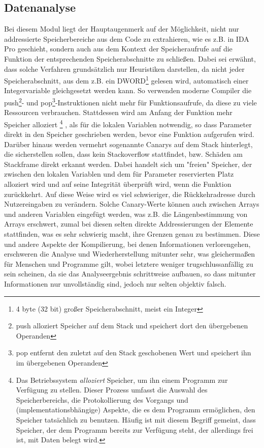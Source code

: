\documentclass[11pt]{article}
\begin{document}
\subsection{Datenanalyse}
Bei diesem Modul liegt der Hauptaugenmerk auf der Möglichkeit, nicht nur
addressierte Speicherbereiche aus dem Code zu extrahieren, wie es z.B. in IDA Pro
geschieht, sondern auch aus dem Kontext der Speicheraufrufe auf die Funktion der entsprechenden
Speicherabschnitte zu schließen. Dabei sei erwähnt, dass solche Verfahren grundsätzlich nur
Heuristiken darstellen, da nicht jeder Speicherabschnitt, aus dem z.B. ein DWORD\footnote{4 byte (32
bit) großer Speicherabschnitt, meist ein Integer} gelesen wird, automatisch einer Integervariable
gleichgesetzt werden kann. So verwenden moderne Compiler die push\footnote{push alloziert Speicher
auf dem Stack und speichert dort den übergebenen Operanden}- und pop\footnote{pop entfernt den
zuletzt auf den Stack geschobenen Wert und speichert ihn im übergebenen Operanden}-Instruktionen
nicht mehr für Funktionsaufrufe, da diese zu viele Ressourcen verbrauchen. Stattdessen wird am
Anfang der Funktion mehr Speicher alloziert
\footnote{Das Betriebssystem \textit{alloziert} Speicher, um ihn einem Programm zur Verfügung zu
stellen. Dieser Prozess umfasst die Auswahl des Speicherbereichs, die Protokollierung des Vorgangs
und (implementationsbhängige) Aspekte, die es dem Programm ermöglichen, den Speicher tatsächlich
zu benutzen. Häufig ist mit diesem Begriff gemeint, dass Speicher, der dem Programm bereits zur Verfügung
steht, der allerdings frei ist, mit Daten belegt wird.}
, als für die lokalen Variablen notwendig, so dass
Parameter direkt in den Speicher geschrieben werden, bevor eine Funktion aufgerufen wird. Darüber
hinaus werden vermehrt sogenannte Canarys auf dem Stack hinterlegt, die sicherstellen sollen, dass
kein Stackoverflow stattfindet, bzw. Schäden am Stackframe direkt erkannt werden.
Dabei handelt sich um "freien" Speicher, der zwischen den lokalen
Variablen und dem für Parameter reservierten Platz alloziert wird und auf seine Integrität überprüft
wird, wenn die Funktion zurückkehrt. Auf diese Weise wird es viel schwieriger, die Rückkehradresse
durch Nutzereingaben zu verändern. Solche Canary-Werte können auch zwischen Arrays und anderen
Variablen eingefügt werden, was z.B. die Längenbestimmung von Arrays erschwert, zumal bei diesen
selten direkte Addressierungen der Elemente stattfinden, was es sehr schwierig macht, ihre Grenzen
genau zu bestimmen. Diese und andere Aspekte der Kompilierung, bei denen Informationen verlorengehen,
erschweren die Analyse und Wiederherstellung mitunter sehr, was gleichermaßen für Menschen und
Programme gilt, wobei letztere weniger trugschlussanfällig zu sein scheinen, da sie das Analyseergebnis
schrittweise aufbauen, so dass mitunter Informationen nur unvollständig sind, jedoch nur selten objektiv falsch.
\end{document}
